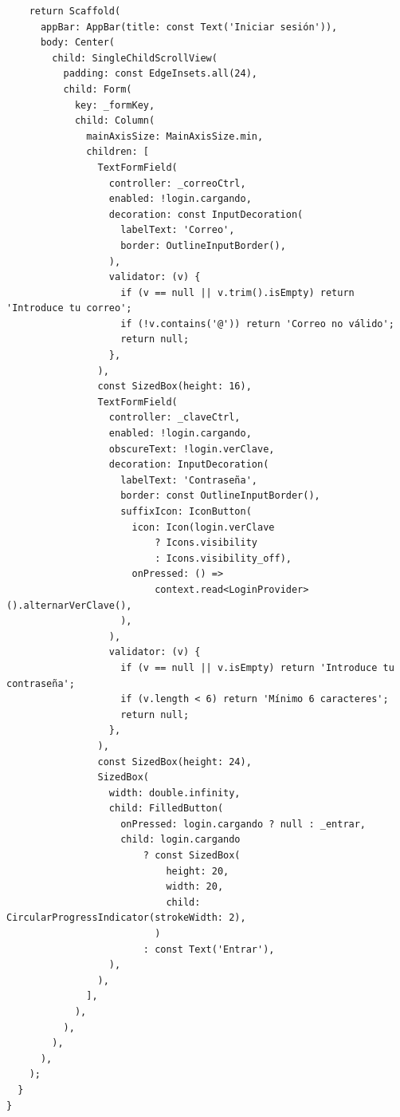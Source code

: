 \documentclass[11pt,a4paper,oneside]{book}
\begin{document}
\begin{lstlisting}
    return Scaffold(
      appBar: AppBar(title: const Text('Iniciar sesión')),
      body: Center(
        child: SingleChildScrollView(
          padding: const EdgeInsets.all(24),
          child: Form(
            key: _formKey,
            child: Column(
              mainAxisSize: MainAxisSize.min,
              children: [
                TextFormField(
                  controller: _correoCtrl,
                  enabled: !login.cargando,
                  decoration: const InputDecoration(
                    labelText: 'Correo',
                    border: OutlineInputBorder(),
                  ),
                  validator: (v) {
                    if (v == null || v.trim().isEmpty) return 'Introduce tu correo';
                    if (!v.contains('@')) return 'Correo no válido';
                    return null;
                  },
                ),
                const SizedBox(height: 16),
                TextFormField(
                  controller: _claveCtrl,
                  enabled: !login.cargando,
                  obscureText: !login.verClave,
                  decoration: InputDecoration(
                    labelText: 'Contraseña',
                    border: const OutlineInputBorder(),
                    suffixIcon: IconButton(
                      icon: Icon(login.verClave
                          ? Icons.visibility
                          : Icons.visibility_off),
                      onPressed: () =>
                          context.read<LoginProvider>().alternarVerClave(),
                    ),
                  ),
                  validator: (v) {
                    if (v == null || v.isEmpty) return 'Introduce tu contraseña';
                    if (v.length < 6) return 'Mínimo 6 caracteres';
                    return null;
                  },
                ),
                const SizedBox(height: 24),
                SizedBox(
                  width: double.infinity,
                  child: FilledButton(
                    onPressed: login.cargando ? null : _entrar,
                    child: login.cargando
                        ? const SizedBox(
                            height: 20,
                            width: 20,
                            child: CircularProgressIndicator(strokeWidth: 2),
                          )
                        : const Text('Entrar'),
                  ),
                ),
              ],
            ),
          ),
        ),
      ),
    );
  }
}
\end{lstlisting}
\end{document}
